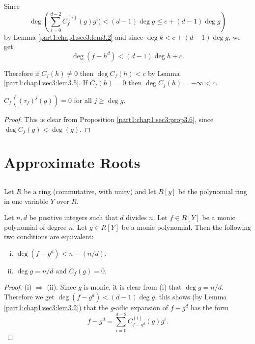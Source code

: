 Since
$$
\deg \left(\sum^{d-2}_{i=0}  C_f ^{(i)} (g) g^i) < (d-1) \deg g \leq c + (d-1) \deg g\right)
$$
by Lemma \ref{part1:chap1:sec3:lem3.2} and since $\deg k < c + (d-1) \deg g$, we get
$$
\deg (f- h^d) < (d-1) \deg h+c.
$$

Therefore if $C_f (h) \neq 0$ then $\deg C_f (h) < c$ by Lemma \ref{part1:chap1:sec3:lem3.5}. If $C_f(h) =0$ then $\deg C_f (h) =- \infty < c$.\pageoriginale

\begin{coro}\label{part1:chap1:sec3:coro3.7}
$C_f ((\tau_f)^j (g)) = 0$ for all $j \geq \deg g$.
\end{coro}

\begin{proof}
  This is clear from Proposition \ref{part1:chap1:sec3:prop3.6}, since $\deg C_f (g) < \deg (g)$.
\end{proof}

\section{Approximate Roots}\label{part1:chap1:sec4}

\subsection{}\label{part1:chap1:sec4:ss4.1}

Let $R$ be a ring (commutative, with unity) and let $R[y]$ be the polynomial ring in one variable $Y$ over $R$.

\setcounter{thm}{1}
\begin{prop}\label{part1:chap1:sec4:prop4.2}
  Let $n, d$ be positive integers such that $d$ divides $n$. Let $f \in R [Y]$ be a monic polynomial of degree $n$. Let $g \in R[Y]$ be a monic polynomial. Then the following two conditions are equivalent:
\begin{enumerate}[(i)]
\item $\deg (f- g^d) < n - (n/d)$.
\item $\deg g = n/d$ and $C_f (g)=0$.
\end{enumerate}
\end{prop}

\begin{proof}
  (i) $\Rightarrow$ (ii). Since $g$ is monic, it is clear from (i) that $\deg g = n/d$. Therefore we get $\deg (f-g^d)< (d-1) \deg g$. this shows (by Lemma \ref{part1:chap1:sec3:lem3.2}) that the $g$-adic expansion of $f- g^d$ has the form
$$
f- g^d = \sum^{d-2}_{i=0} C_{f-g^d}^{(i)}(g) g^i.
$$
\end{proof}

